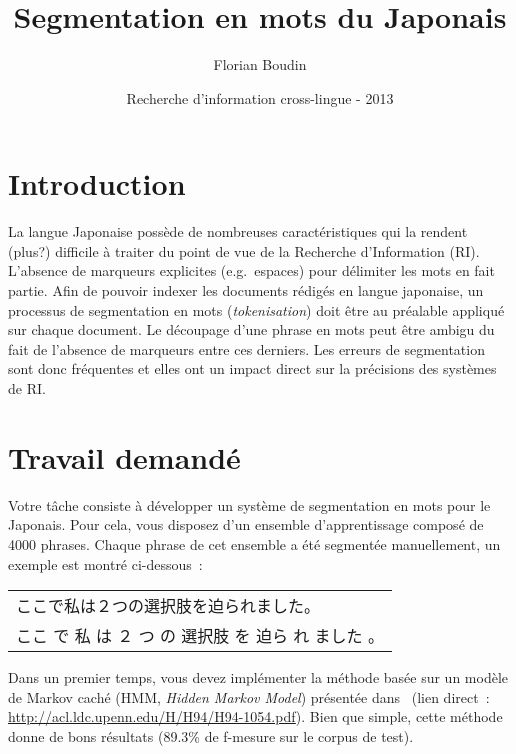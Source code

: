 \documentclass[12pt,a4paper]{article}
\begin{document}
\title{Segmentation en mots du Japonais}
\author{Florian Boudin}
\date{Recherche d'information cross-lingue - 2013}

\maketitle

\section{Introduction}

La langue Japonaise possède de nombreuses caractéristiques qui la rendent (plus?) difficile à traiter du point de vue de la Recherche d'Information (RI).
L'absence de marqueurs explicites (e.g.~espaces) pour délimiter les mots en fait partie.
Afin de pouvoir indexer les documents rédigés en langue japonaise, un processus de segmentation en mots (\textit{tokenisation}) doit être au préalable appliqué sur chaque document.
Le découpage d'une phrase en mots peut être ambigu du fait de l'absence de marqueurs entre ces derniers.
Les erreurs de segmentation sont donc fréquentes et elles ont un impact direct sur la précisions des systèmes de RI.

\section{Travail demandé}

Votre tâche consiste à développer un système de segmentation en mots pour le Japonais.
Pour cela, vous disposez d'un ensemble d'apprentissage composé de 4000 phrases.
Chaque phrase de cet ensemble a été segmentée manuellement, un exemple est montré ci-dessous~:

\begin{table}[h!]
\centering
\begin{CJK}{UTF8}{min}
\begin{tabular}{l}
    ここで私は２つの選択肢を迫られました。\\[0.5em]
    ここ \quad で \quad 私 \quad は \quad ２ \quad つ \quad の \quad 選択肢 \quad 
    を \quad 迫ら \quad れ \quad ました \quad 。
\end{tabular}
\end{CJK}
\end{table}

Dans un premier temps, vous devez implémenter la méthode basée sur un modèle de Markov caché (HMM, \textit{Hidden Markov Model}) présentée dans~\cite{lamport94} (lien direct~: \url{http://acl.ldc.upenn.edu/H/H94/H94-1054.pdf}).
Bien que simple, cette méthode donne de bons résultats (89.3\% de f-mesure sur le corpus de test).
\end{document}
